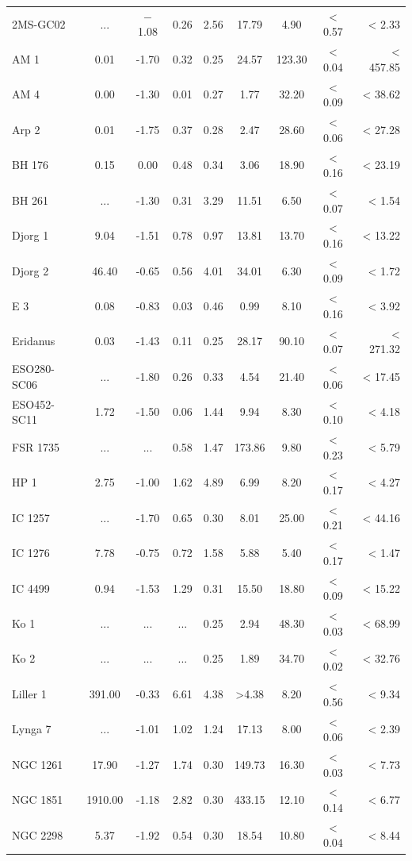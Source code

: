 \documentclass[doublespace,nopageskip]{VTthesis}
\begin{document}
\begin{appendices}
\begin{center}
\begin{longtable}{lcccccccr}
2MS-GC02 & ... & $-$1.08 & 0.26 & 2.56 & 17.79 & 4.90 & < 0.57 & < 2.33\\
AM 1 & 0.01 & -1.70 & 0.32 & 0.25 & 24.57 & 123.30 & < 0.04 & < 457.85\\
AM 4 & 0.00 & -1.30 & 0.01 & 0.27 & 1.77 & 32.20 & < 0.09 & < 38.62\\
Arp 2 & 0.01 & -1.75 & 0.37 & 0.28 & 2.47 & 28.60 & < 0.06 & < 27.28\\
BH 176 & 0.15 & 0.00 & 0.48 & 0.34 & 3.06 & 18.90 & < 0.16 & < 23.19\\
BH 261 & ... & -1.30 & 0.31 & 3.29 & 11.51 & 6.50 & < 0.07 & < 1.54\\
Djorg 1 & 9.04 & -1.51 & 0.78 & 0.97 & 13.81 & 13.70 & < 0.16 & < 13.22\\
Djorg 2 & 46.40 & -0.65 & 0.56 & 4.01 & 34.01 & 6.30 & < 0.09 & < 1.72\\
E 3 & 0.08 & -0.83 & 0.03 & 0.46 & 0.99 & 8.10 & < 0.16 & < 3.92\\
Eridanus & 0.03 & -1.43 & 0.11 & 0.25 & 28.17 & 90.10 & < 0.07 & < 271.32\\
ESO280-SC06 & ... & -1.80 & 0.26 & 0.33 & 4.54 & 21.40 & < 0.06 & < 17.45\\
ESO452-SC11 & 1.72 & -1.50 & 0.06 & 1.44 & 9.94 & 8.30 & < 0.10 & < 4.18\\
FSR 1735 & ... & ... & 0.58 & 1.47 & 173.86 & 9.80 & < 0.23 & < 5.79\\
HP 1 & 2.75 & -1.00 & 1.62 & 4.89 & 6.99 & 8.20 & < 0.17 & < 4.27\\
IC 1257 & ... & -1.70 & 0.65 & 0.30 & 8.01 & 25.00 & < 0.21 & < 44.16\\
IC 1276 & 7.78 & -0.75 & 0.72 & 1.58 & 5.88 & 5.40 & < 0.17 & < 1.47\\
IC 4499 & 0.94 & -1.53 & 1.29 & 0.31 & 15.50 & 18.80 & < 0.09 & < 15.22\\
Ko 1 & ... & ... & ... & 0.25 & 2.94 & 48.30 & < 0.03 & < 68.99\\
Ko 2 & ... & ... & ... & 0.25 & 1.89 & 34.70 & < 0.02 & < 32.76\\
Liller 1 & 391.00 & -0.33 & 6.61 & 4.38 & >4.38 & 8.20 & < 0.56 & < 9.34\\
Lynga 7 & ... & -1.01 & 1.02 & 1.24 & 17.13 & 8.00 & < 0.06 & < 2.39\\
NGC 1261 & 17.90 & -1.27 & 1.74 & 0.30 & 149.73 & 16.30 & < 0.03 & < 7.73\\
NGC 1851 & 1910.00 & -1.18 & 2.82 & 0.30 & 433.15 & 12.10 & < 0.14 & < 6.77\\
NGC 2298 & 5.37 & -1.92 & 0.54 & 0.30 & 18.54 & 10.80 & < 0.04 & < 8.44\\

\end{longtable}
\end{center}
\end{appendices}
\end{document}
